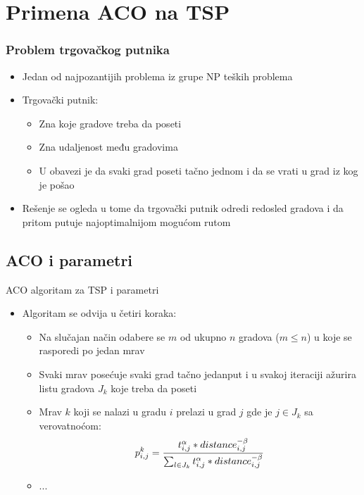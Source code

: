 \documentclass[11pt]{beamer}
\begin{document}
\section{Primena ACO na TSP}
\begin{frame}{}
\frametitle{Problem trgovačkog putnika}
\begin{itemize}
  \item Jedan od najpozantijih problema iz grupe NP teških problema
  \item Trgovački putnik:
  	\begin{itemize}
  		\item Zna koje gradove treba da poseti
  		\item Zna udaljenost među gradovima
  		\item U obavezi je da svaki grad poseti tačno jednom i da se vrati u grad iz kog je pošao
  	\end{itemize}
  \item Rešenje se ogleda u tome da trgovački putnik odredi redosled gradova i da pritom putuje najoptimalnijom mogućom rutom
\end{itemize}
\end{frame}


\subsection{ACO i parametri}
\begin{frame}{ACO algoritam za TSP i parametri}
\begin{itemize}
  		\item Algoritam se odvija u četiri koraka:
  		\begin{itemize} 
  		\item Na slučajan način odabere se $m$ od ukupno $n$ gradova ($m 	\leq n$) u koje se rasporedi po jedan mrav
  		\item Svaki mrav posećuje svaki grad tačno jedanput i u svakoj iteraciji ažurira listu gradova $J_{k}$ koje treba da poseti
  		\item Mrav $k$ koji se nalazi u gradu $i$ prelazi u grad $j$ gde je
  		$j \in J_{k}$ sa verovatnoćom:
  		\begin{equation}\label{1}
			p_{i,j}^k = {t_{i,j}^\alpha * distance_{i,j}^{-\beta} \over \sum_{l 			\in J_k}^{} t_{i,j}^\alpha * distance_{i,j}^{-\beta}}
		\end{equation}
		\item ...
  		\end{itemize} 
\end{itemize} 
\end{frame}
\end{document}
